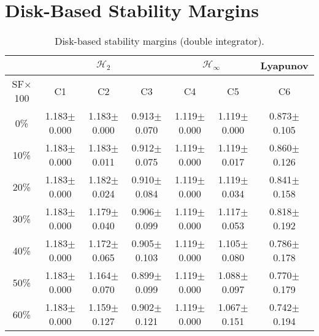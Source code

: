 \section{Disk-Based Stability Margins}
\begin{table}[H]
\centering
\scriptsize
\begin{tabular}{| c || c | c | c | c | c | c |}
	\hline
	 & \multicolumn{3}{c|}{$\mathcal{H}_{2}$} & \multicolumn{2}{c|}{$\mathcal{H}_{\infty}$} & Lyapunov\\
	\hline
	SF$\times$100 & C1& C2 & C3 & C4 & C5 & C6\\
	\hline\hline
	0\% & 1.183$\pm$0.000 & 1.183$\pm$0.000 & 0.913$\pm$0.070 & 1.119$\pm$0.000 & 1.119$\pm$0.000 & 0.873$\pm$0.105\\
	\hline
	10\% & 1.183$\pm$0.000 & 1.183$\pm$0.011 & 0.912$\pm$0.075 & 1.119$\pm$0.000 & 1.119$\pm$0.017 & 0.860$\pm$0.126\\
	\hline
	20\% & 1.183$\pm$0.000 & 1.182$\pm$0.024 & 0.910$\pm$0.084 & 1.119$\pm$0.000 & 1.119$\pm$0.034 & 0.841$\pm$0.158\\
	\hline
	30\% & 1.183$\pm$0.000 & 1.179$\pm$0.040 & 0.906$\pm$0.099 & 1.119$\pm$0.000 & 1.117$\pm$0.053 & 0.818$\pm$0.192\\
	\hline
	40\% & 1.183$\pm$0.000 & 1.172$\pm$0.065 & 0.905$\pm$0.103 & 1.119$\pm$0.000 & 1.105$\pm$0.080 & 0.786$\pm$0.178\\
	\hline
	50\% & 1.183$\pm$0.000 & 1.164$\pm$0.070 & 0.899$\pm$0.099 & 1.119$\pm$0.000 & 1.088$\pm$0.097 & 0.770$\pm$0.179\\
	\hline
	60\% & 1.183$\pm$0.000 & 1.159$\pm$0.127 & 0.902$\pm$0.121 & 1.119$\pm$0.000 & 1.067$\pm$0.151 & 0.742$\pm$0.194\\
	\hline
\end{tabular}
\caption{Disk-based stability margins (double integrator).}
\label{table:disk_margins_double_integrator:unc}
\end{table}

